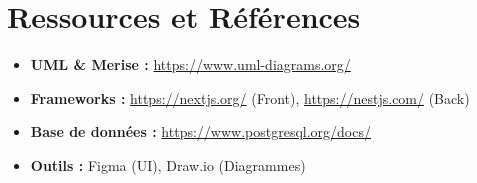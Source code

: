 \section{Ressources et Références}

\begin{itemize}
    \item \textbf{UML \& Merise :} \url{https://www.uml-diagrams.org/}
    \item \textbf{Frameworks :} \url{https://nextjs.org/} (Front), \url{https://nestjs.com/} (Back)
    \item \textbf{Base de données :} \url{https://www.postgresql.org/docs/}
    \item \textbf{Outils :} Figma (UI), Draw.io (Diagrammes)
\end{itemize}